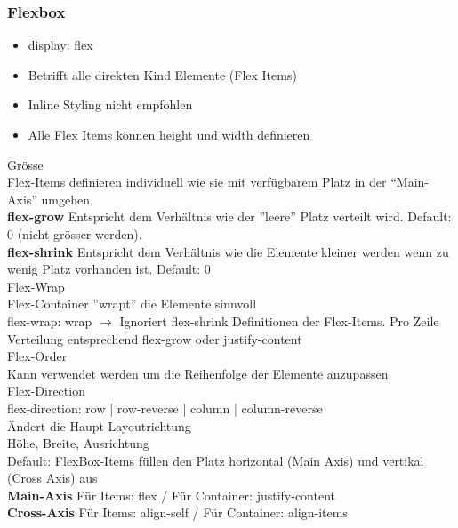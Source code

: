 \subsubsection{Flexbox}
\begin{itemize}
    \item display: flex
    \item Betrifft alle direkten Kind Elemente (Flex Items)
    \item Inline Styling nicht empfohlen
    \item Alle Flex Items können height und width definieren
\end{itemize}
\textcolor{subsectioncolor}{Grösse}\\
Flex-Items definieren individuell wie sie mit verfügbarem Platz in der “Main-Axis” umgehen.\\
\textbf{flex-grow} Entspricht dem Verhältnis wie der ''leere'' Platz verteilt wird. Default: 0 (nicht grösser werden).\\
\textbf{flex-shrink} Entspricht dem Verhältnis wie die Elemente kleiner werden wenn zu wenig Platz vorhanden ist. Default: 0\\
\textcolor{subsectioncolor}{Flex-Wrap}\\
Flex-Container ''wrapt'' die Elemente sinnvoll\\
flex-wrap: wrap $\rightarrow$ Ignoriert flex-shrink Definitionen der Flex-Items. Pro Zeile Verteilung entsprechend flex-grow oder justify-content\\
\textcolor{subsectioncolor}{Flex-Order}\\
Kann verwendet werden um die Reihenfolge der Elemente anzupassen\\
\textcolor{subsectioncolor}{Flex-Direction}\\
flex-direction: row | row-reverse | column | column-reverse\\
Ändert die Haupt-Layoutrichtung\\
\textcolor{subsectioncolor}{Höhe, Breite, Ausrichtung}\\
Default: FlexBox-Items füllen den Platz horizontal (Main Axis) und vertikal (Cross Axis) aus\\
\textbf{Main-Axis} Für Items: flex / Für Container: justify-content\\
\textbf{Cross-Axis} Für Items: align-self / Für Container: align-items


